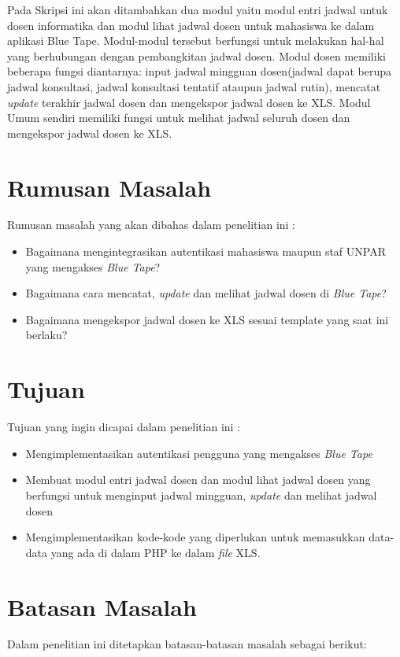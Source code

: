 
Pada Skripsi ini akan ditambahkan dua modul yaitu modul entri jadwal untuk dosen informatika dan modul lihat jadwal dosen untuk mahasiswa ke dalam aplikasi Blue Tape. Modul-modul tersebut berfungsi untuk melakukan hal-hal yang berhubungan dengan pembangkitan jadwal dosen. Modul dosen memiliki beberapa fungsi diantarnya: input jadwal mingguan dosen(jadwal dapat berupa jadwal konsultasi, jadwal konsultasi tentatif ataupun jadwal rutin), mencatat \textit{update} terakhir jadwal dosen dan mengekspor jadwal dosen ke XLS. Modul Umum sendiri memiliki fungsi untuk melihat jadwal seluruh dosen dan mengekspor jadwal dosen ke XLS.


\section{Rumusan Masalah}
\label{sec:rumusan}
Rumusan masalah yang akan dibahas dalam penelitian ini :
	\begin{itemize}
		\item Bagaimana mengintegrasikan autentikasi mahasiswa maupun staf UNPAR yang mengakses \textit{Blue Tape}?
		\item Bagaimana cara mencatat, \textit{update} dan melihat jadwal dosen di \textit{Blue Tape}?
		\item Bagaimana mengekspor jadwal dosen ke XLS sesuai template yang saat ini berlaku?
	\end{itemize}


\section{Tujuan}
\label{sec:tujuan}
Tujuan yang ingin dicapai dalam penelitian ini : 
	\begin{itemize}
		\item Mengimplementasikan autentikasi pengguna yang mengakses \textit{Blue Tape}
		\item Membuat modul entri jadwal dosen dan modul lihat jadwal dosen yang berfungsi untuk menginput jadwal mingguan, \textit{update} dan melihat jadwal dosen
		\item Mengimplementasikan kode-kode yang diperlukan untuk memasukkan data-data yang ada di dalam PHP ke dalam \textit{file} XLS. 

	\end{itemize}

\section{Batasan Masalah}
\label{sec:batasan}
Dalam penelitian ini ditetapkan batasan-batasan masalah sebagai berikut:

